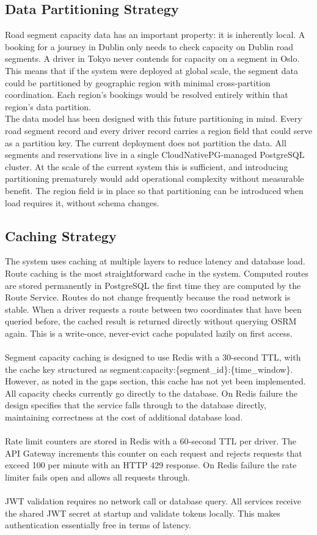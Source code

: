 \documentclass{article}
\begin{document}
\subsection{Data Partitioning Strategy}
Road segment capacity data has an important property: it is inherently local. A booking for a journey in Dublin only needs to check capacity on Dublin road segments. A driver in Tokyo never contends for capacity on a segment in Oslo. This means that if the system were deployed at global scale, the segment data could be partitioned by geographic region with minimal cross-partition coordination. Each region's bookings would be resolved entirely within that region's data partition.\\
The data model has been designed with this future partitioning in mind. Every road segment record and every driver record carries a region field that could serve as a partition key. The current deployment does not partition the data. All segments and reservations live in a single CloudNativePG-managed PostgreSQL cluster. At the scale of the current system this is sufficient, and introducing partitioning prematurely would add operational complexity without measurable benefit. The region field is in place so that partitioning can be introduced when load requires it, without schema changes.

\subsection{Caching Strategy}
The system uses caching at multiple layers to reduce latency and database load.\\
Route caching is the most straightforward cache in the system. Computed routes are stored permanently in PostgreSQL the first time they are computed by the Route Service. Routes do not change frequently because the road network is stable. When a driver requests a route between two coordinates that have been queried before, the cached result is returned directly without querying OSRM again. This is a write-once, never-evict cache populated lazily on first access.\\\\
Segment capacity caching is designed to use Redis with a 30-second TTL, with the cache key structured as segment:capacity:\{segment_id\}:\{time_window\}. However, as noted in the gaps section, this cache has not yet been implemented. All capacity checks currently go directly to the database. On Redis failure the design specifies that the service falls through to the database directly, maintaining correctness at the cost of additional database load. \\\\
Rate limit counters are stored in Redis with a 60-second TTL per driver. The API Gateway increments this counter on each request and rejects requests that exceed 100 per minute with an HTTP 429 response. On Redis failure the rate limiter fails open and allows all requests through.\\\\
JWT validation requires no network call or database query. All services receive the shared JWT secret at startup and validate tokens locally. This makes authentication essentially free in terms of latency.
\end{document}
